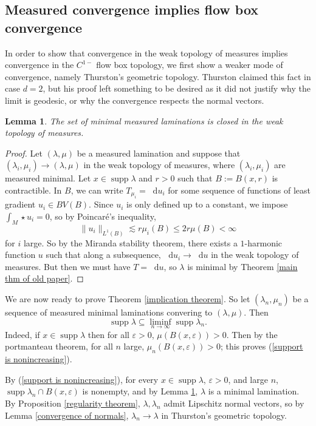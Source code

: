 \documentclass[reqno,11pt]{amsart}
\newcommand*\dif{\mathop{}\!\mathrm{d}}
\DeclareMathOperator{\supp}{supp}
\newtheorem{lemma}[theorem]{Lemma}
\theoremstyle{definition}
\numberwithin{equation}{section}
\begin{document}
\subsection{Measured convergence implies flow box convergence}
In order to show that convergence in the weak topology of measures implies convergence in the $C^{1-}$ flow box topology, we first show a weaker mode of convergence, namely Thurston's geometric topology.
Thurston claimed this fact \cite[Proposition 8.10.3]{thurston1979geometry} in case $d = 2$, but his proof left something to be desired as it did not justify why the limit is geodesic, or why the convergence respects the normal vectors.

\begin{lemma}\label{limits of measured geodesic lams are geodesic}
	The set of minimal measured laminations is closed in the weak topology of measures.
\end{lemma}
\begin{proof}
Let $(\lambda, \mu)$ be a measured lamination and suppose that $(\lambda_i, \mu_i) \to (\lambda, \mu)$ in the weak topology of measures, where $(\lambda_i, \mu_i)$ are measured minimal.
Let $x \in \supp \lambda$ and $r > 0$ such that $B := B(x, r)$ is contractible.
In $B$, we can write $T_{\mu_i} = \dif u_i$ for some sequence of functions of least gradient $u_i \in BV(B)$.
Since $u_i$ is only defined up to a constant, we impose $\int_M \star u_i = 0$, so by Poincar\'e's inequality,
$$\|u_i\|_{L^1(B)} \lesssim r\mu_i(B) \leq 2r \mu(B) < \infty$$
for $i$ large.
So by the Miranda stability theorem, there exists a $1$-harmonic function $u$ such that along a subsequence, $\dif u_i \to \dif u$ in the weak topology of measures.
But then we must have $T = \dif u$, so $\lambda$ is minimal by Theorem \ref{main thm of old paper}.
\end{proof}

We are now ready to prove Theorem \ref{implication theorem}.
So let $(\lambda_n, \mu_n)$ be a sequence of measured minimal laminations convering to $(\lambda, \mu)$.
Then
\begin{equation}\label{support is nonincreasing}
	\supp \lambda \subseteq \liminf_{n \to \infty} \supp \lambda_n.
\end{equation}
Indeed, if $x \in \supp \lambda$ then for all $\varepsilon > 0$, $\mu(B(x, \varepsilon)) > 0$.
Then by the portmanteau theorem, for all $n$ large, $\mu_n(B(x, \varepsilon)) > 0$; this proves (\ref{support is nonincreasing}).

By (\ref{support is nonincreasing}), for every $x \in \supp \lambda$, $\varepsilon > 0$, and large $n$, $\supp \lambda_n \cap B(x, \varepsilon)$ is nonempty, and by Lemma \ref{limits of measured geodesic lams are geodesic}, $\lambda$ is a minimal lamination.
By Proposition \ref{regularity theorem}, $\lambda, \lambda_n$ admit Lipschitz normal vectors, so by Lemma \ref{convergence of normals}, $\lambda_n \to \lambda$ in Thurston's geometric topology.
\end{document}
